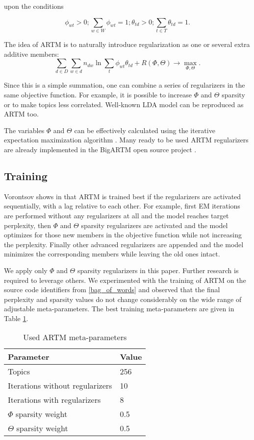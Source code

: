 \documentclass[conference,10pt]{IEEEtran}
\begin{document}
upon the conditions

\begin{equation}
\phi_{wt} > 0; \sum_{w\in W}\phi_{wt} = 1;
\theta_{td} > 0; \sum_{t\in T}\theta_{td} = 1.
\end{equation}

The idea of ARTM is to naturally introduce regularization as one or several extra additive members:
\begin{equation}
\sum_{d\in D}\sum_{w\in d}n_{dw}\ln \sum_{t}\phi_{wt} \theta_{td} + R(\Phi,\Theta) \to \max_{\Phi,\Theta}.
\end{equation}

Since this is a simple summation, one can combine a series of regularizers in the same objective function. For example, it is possible to increase $\Phi$ and $\Theta$ sparsity or to make topics less correlated. Well-known LDA
 model \cite{Blei:2003:LDA:944919.944937} can be reproduced as ARTM too.

The variables $\Phi$ and $\Theta$ can be effectively calculated using the iterative expectation maximization algorithm \cite{College02theexpectation}.
Many ready to be used ARTM regularizers are already implemented in the BigARTM open source project \cite{BigARTM}.

\subsection{Training}
Vorontsov shows in \cite{Vorontsov2015} that ARTM is trained best if the regularizers are activated sequentially, with a lag relative to each other. For example, first EM iterations are performed without any regularizers at all and the model reaches target perplexity, then $\Phi$ and $\Theta$ sparsity regularizers are activated and the model optimizes for those new members in the objective function while not increasing the perplexity. Finally other advanced regularizers are appended and the model minimizes the corresponding members while leaving the old ones intact.

We apply only $\Phi$ and $\Theta$ sparsity regularizers in this paper. Further research is required to leverage others. We experimented with the training of ARTM on the source code identifiers from \ref{bag_of_words} and observed that the final perplexity and sparsity values do not change considerably on the wide range of adjustable meta-parameters. The best training meta-parameters are given in Table \ref{artm_meta}.
\begin{table}
\caption{Used ARTM meta-parameters}
\label{artm_meta}
\centering
\begin{tabular}{| l | l |}
\hline
\textbf{Parameter} & \textbf{Value} \\
\hline
Topics & 256 \\
Iterations without regularizers & 10 \\
Iterations with regularizers & 8 \\
$\Phi$ sparsity weight & 0.5 \\
$\Theta$ sparsity weight & 0.5 \\
\hline
\end{tabular}
\end{table}
\end{document}
